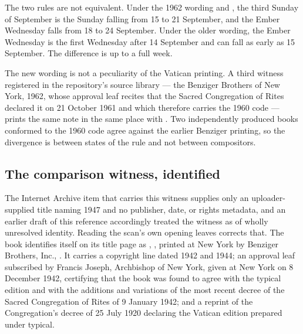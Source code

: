 The two rules are not equivalent. Under the 1962 wording and , the third Sunday of
September is the Sunday falling from 15 to 21 September, and the Ember Wednesday falls from 18 to
24 September. Under the older wording, the Ember Wednesday is the first Wednesday after
14 September and can fall as early as 15 September. The difference is up to a full week.

The new wording is not a peculiarity of the Vatican printing. A third witness registered in the
repository's source library — the Benziger Brothers  of New York,
1962, whose approval leaf recites that the Sacred Congregation of Rites declared it
 on 21 October 1961 and which therefore carries the 1960 code — prints the
same note in the same place with . Two independently
produced books conformed to the 1960 code agree against the earlier Benziger printing, so the
divergence is between states of the rule and not between compositors.

\subsection{The comparison witness, identified}
\label{sec:witness}

The Internet Archive item that carries this witness supplies only an uploader-supplied title
naming 1947 and no publisher, date, or rights metadata, and an earlier draft of this reference
accordingly treated the witness as of wholly unresolved identity. Reading the scan's own opening
leaves corrects that. The book identifies itself on its title page as ,
, printed at New York by Benziger Brothers, Inc.,
. It carries a copyright
line dated 1942 and 1944; an approval leaf subscribed by Francis Joseph, Archbishop of New York,
given at New York on 8 December 1942, certifying that the book was found to agree with the
typical edition and with the additions and variations of the most recent decree of the Sacred
Congregation of Rites of 9 January 1942; and a reprint of the Congregation's decree of
25 July 1920 declaring the Vatican edition prepared under  typical.


